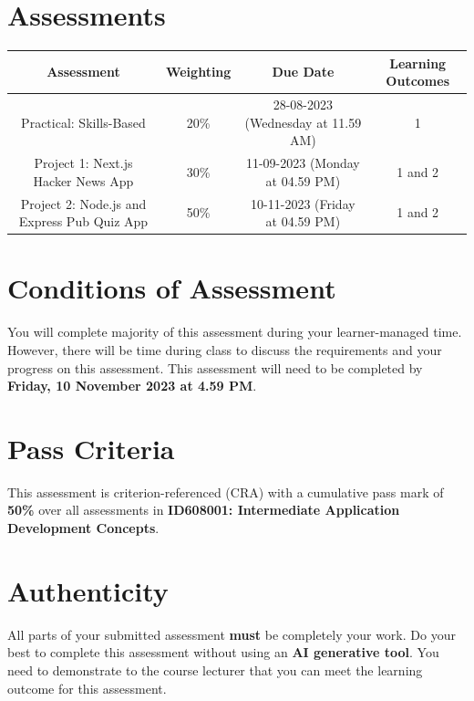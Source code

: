 \documentclass{article}
\begin{document}
\section*{Assessments}
\renewcommand{\arraystretch}{1.5}
\begin{tabular}{|c|c|c|c|}
	\hline
	\textbf{Assessment}                                 & \textbf{Weighting} & \textbf{Due Date}            & \textbf{Learning Outcomes} \\ \hline
	\small Practical: Skills-Based & \small 20\%        & \small 28-08-2023 (Wednesday at 11.59 AM)   & \small 1                   \\ \hline
	\small Project 1: Next.js Hacker News App             & \small 30\%        & \small 11-09-2023 (Monday at 04.59 PM)  & \small 1 and 2                   \\ \hline
	\small Project 2: Node.js and Express Pub Quiz App                       & \small 50\%        & \small 10-11-2023 (Friday at 04.59 PM)  & \small 1 and 2                   \\ \hline
\end{tabular}

\section*{Conditions of Assessment}
You will complete majority of this assessment during your learner-managed time. However, there will be time during class to discuss the requirements and your progress on this assessment. This assessment will need to be completed by \textbf{Friday, 10 November 2023 at 4.59 PM}.

\section*{Pass Criteria}
This assessment is criterion-referenced (CRA) with a cumulative pass mark of \textbf{50\%} over all assessments in \textbf{ID608001: Intermediate Application Development Concepts}.

\section*{Authenticity}
All parts of your submitted assessment \textbf{must} be completely your work. Do your best to complete this assessment without using an \textbf{AI generative tool}. You need to demonstrate to the course lecturer that you can meet the learning outcome for this assessment. \\
 
\end{document}
